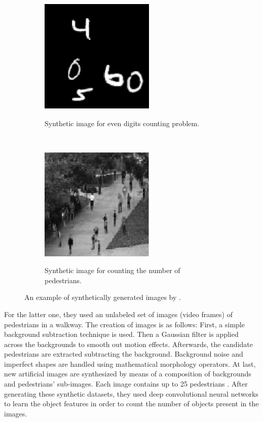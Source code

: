 \begin{figure}[h!]
    \centering
    \begin{subfigure}[t]{0.5\textwidth}
        \centering
        {\includegraphics[width=0.6\textwidth]{images/digdigdig}}
        \caption{Synthetic image for even digits counting problem.}
    \end{subfigure}%
    ~ 
    \begin{subfigure}[t]{0.5\textwidth}
        \centering
        {\includegraphics[width=0.6\textwidth]{images/pedpedped}}
        \caption{Synthetic image for counting the number of pedestrians.}
    \end{subfigure}
    \caption{An example of synthetically generated images by \citealt*{segui2015learning}.}
    \label{digped}
\end{figure}

For the latter one, they used an unlabeled set of images (video frames) of pedestrians in a walkway. The creation of images is as follows: First, a simple background subtraction technique is used. Then a Gaussian filter is applied across the backgrounds to smooth out motion effects. Afterwards, the candidate pedestrians are extracted subtracting the background. Background noise and imperfect shapes are handled using mathematical morphology operators. At last, new artificial images are synthesized by means of a composition of backgrounds and pedestrians' sub-images. Each image contains up to 25 pedestrians \cite{segui2015learning}. After generating these synthetic datasets, they used deep convolutional neural networks to learn the object features in order to count the number of objects present in the images.     
  
